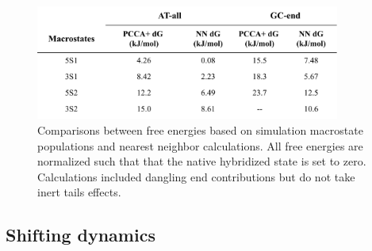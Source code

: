 \documentclass[journal=jpcbfk,manuscript=article]{achemso}
\begin{document}

\begin{figure}[ht!] %
	\begin{center} 
        \includegraphics[width=100mm, scale=1]{Figs/figs_imp/shifted_FE_table.png}
        \caption{Comparisons between free energies based on simulation macrostate populations and nearest neighbor calculations. All free energies are normalized such that that the native hybridized state is set to zero. Calculations included dangling end contributions but do not take inert tails effects.}

        \label{fig:NN_table}
	\end{center}
\end{figure}


\subsection{Shifting dynamics}
\end{document}
